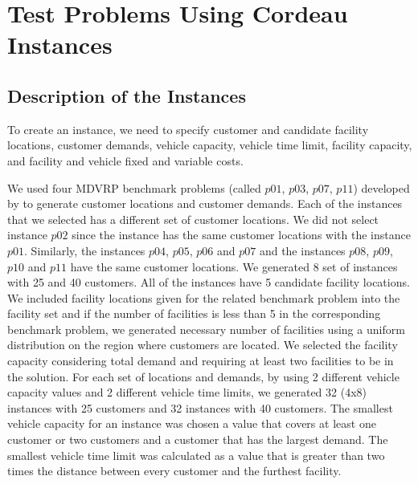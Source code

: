 
\section{Test Problems Using Cordeau Instances}
\label{CordeauTest}
\subsection{Description of the Instances}
\label{ssec:DesCord}

To create an instance, we need to specify customer and candidate facility locations, 
customer demands, vehicle capacity, vehicle time limit, facility capacity, 
and facility and vehicle fixed and variable costs. 

We used four MDVRP benchmark problems (called $p01$, $p03$, $p07$, $p11$) 
developed by \citet{Cordeau2} to generate customer locations and customer demands. 
Each of the \citet{Cordeau2} instances that we selected has a different set of customer 
locations. We did not select instance $p02$ since the instance has the same customer 
locations with the instance $p01$. Similarly, the instances $p04$, $p05$, $p06$
and $p07$ and the instances $p08$, $p09$, $p10$ and $p11$ have the same customer locations.
We generated  8 set of instances with 25 and 40 customers. All of the instances have 
5 candidate facility locations. We included facility locations given for the related 
benchmark problem into the facility set and if the number of facilities is less than 
5 in the corresponding benchmark problem, we generated necessary number of facilities 
using a uniform distribution on the  
region where customers are located. We selected the facility capacity considering 
total demand and requiring at least two facilities to be in the solution.  
For each set of locations and demands, by using 2 different vehicle capacity 
values and 2 different vehicle time limits, we generated 32 (4x8) instances with 25 customers
and 32 instances  with 40 customers. The smallest vehicle capacity 
for an instance was chosen a value that covers at least one customer or two customers and 
a customer that has the largest demand. The smallest vehicle time limit was calculated 
as a value that is greater than two times the distance between every customer and the 
furthest facility.

